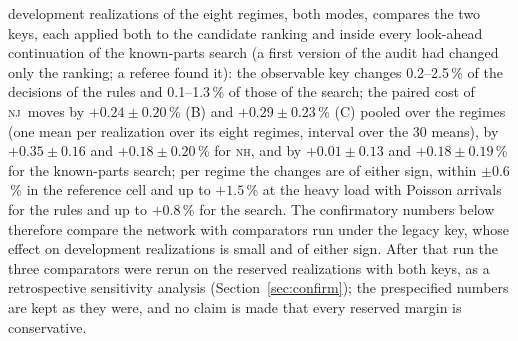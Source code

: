 \documentclass[11pt,a4paper]{article}
\theoremstyle{plain}
\theoremstyle{definition}
\theoremstyle{remark}
\newcommand{\nj}{\textsc{nj}}
\newcommand{\nh}{\textsc{nh}}
\begin{document}
development realizations of the eight regimes, both modes, compares the two keys, each
applied both to the candidate ranking and inside every look-ahead continuation of the
known-parts search (a first version of the audit had changed only the ranking; a
referee found it): the observable key changes 0.2--2.5\,\% of the decisions of the
rules and 0.1--1.3\,\% of those of the search; the paired cost of \nj\ moves by
$+0.24\pm0.20$\,\% (B) and $+0.29\pm0.23$\,\% (C) pooled over the regimes (one mean per
realization over its eight regimes, interval over the 30 means), by $+0.35\pm0.16$ and
$+0.18\pm0.20$\,\% for \nh, and by $+0.01\pm0.13$ and $+0.18\pm0.19$\,\% for the
known-parts search; per regime the changes are of either sign, within $\pm0.6$\,\%
in the reference cell and up to $+1.5$\,\% at the heavy load with Poisson arrivals
for the rules and up to $+0.8$\,\% for the search. The confirmatory numbers below therefore
compare the network with comparators run under the legacy key, whose effect on
development realizations is small and of either sign. After that run the three
comparators were rerun on the reserved realizations with both keys, as a retrospective
sensitivity analysis (Section~\ref{sec:confirm}); the prespecified numbers are kept as
they were, and no claim is made that every reserved margin is conservative.
\end{document}
